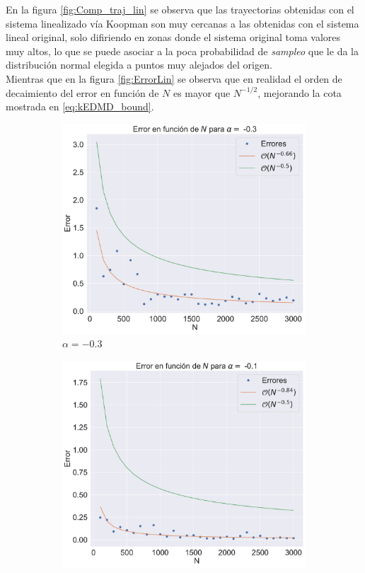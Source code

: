 En la figura \ref{fig:Comp_traj_lin} se observa que las trayectorias obtenidas con el sistema linealizado vía Koopman son muy cercanas a las obtenidas con el sistema lineal original, solo difiriendo en zonas donde el sistema original toma valores muy altos, lo que se puede asociar a la poca probabilidad de \textit{sampleo} que le da la distribución normal elegida a puntos muy alejados del origen. \\
Mientras que en la figura \ref{fig:ErrorLin} se observa que en realidad el orden de decaimiento del error en función de $N$ es mayor que $N^{-1/2}$, mejorando la cota mostrada en \eqref{eq:kEDMD_bound}.
\begin{figure}[h]
    \centering
    \begin{subfigure}[b]{0.32\textwidth}
        \centering
        \includegraphics[width=\textwidth]{img/content/chapter3/Linear1Errors.pdf}
        \caption{$\alpha=-0.3$}
        \label{fig:Linear1Errors}
    \end{subfigure}
    \hfill
    \begin{subfigure}[b]{0.32\textwidth}
        \centering
        \includegraphics[width=\textwidth]{img/content/chapter3/Linear2Errors.pdf}

\end{subfigure}
\end{figure}
